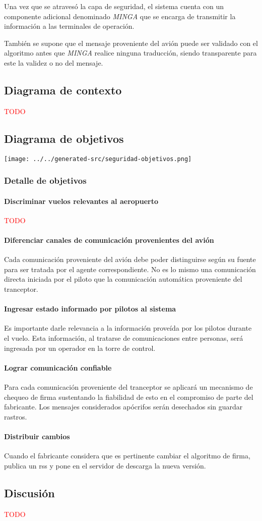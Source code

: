 Una vez que se atravesó la capa de seguridad, el sistema cuenta con un componente adicional denominado \emph{MINGA} que se encarga de transmitir la información a las terminales de operación.

También se supone que el mensaje proveniente del avión puede ser validado con el algoritmo antes que \emph{MINGA} realice ninguna traducción, siendo transparente para este la validez o no del mensaje.

\subsection{Diagrama de contexto}
\textcolor{red}{TODO}

\subsection{Diagrama de objetivos}
\texttt{[image: ../../generated-src/seguridad-objetivos.png]}

\subsubsection{Detalle de objetivos}
\paragraph{Discriminar vuelos relevantes al aeropuerto}
\textcolor{red}{TODO}
\paragraph{Diferenciar canales de comunicación provenientes del avión}
Cada comunicación proveniente del avión debe poder distinguirse según su fuente para ser tratada por el agente correspondiente. No es lo mismo una comunicación directa iniciada por el piloto que la comunicación automática proveniente del tranceptor.
\paragraph{Ingresar estado informado por pilotos al sistema}
Es importante darle relevancia a la información proveída por los pilotos durante el vuelo. Esta información, al tratarse de comunicaciones entre personas, será ingresada por un operador en la torre de control.
\paragraph{Lograr comunicación confiable}
Para cada comunicación proveniente del tranceptor se aplicará un mecanismo de chequeo de firma sustentando la fiabilidad de esto en el compromiso de parte del fabricante. Los mensajes considerados apócrifos serán desechados sin guardar rastros.
\paragraph{Distribuir cambios}
Cuando el fabricante considera que es pertinente cambiar el algoritmo de firma, publica un rss y pone en el servidor de descarga la nueva versión.

\subsection{Discusión}
\textcolor{red}{TODO}
